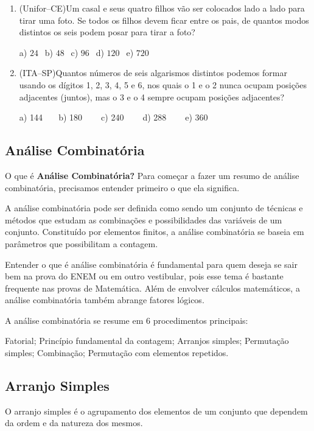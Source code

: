 \begin{multicols*}{2}
\begin{enumerate}
		\item  (Unifor–CE)Um casal e seus quatro filhos vão ser colocados lado a lado para tirar uma foto. Se todos os filhos devem ficar entre os pais, de quantos modos distintos os seis podem posar para tirar a foto?

		a) $24 \ \ $ b) $48 \ \ $ c) $96 \ \ $ d) $120 \ \ $ e) $720 \ \ $

		\item  (ITA–SP)Quantos números de seis algarismos distintos podemos formar usando os dígitos 1, 2, 3, 4, 5 e 6, nos quais o 1 e o 2 nunca ocupam posições adjacentes (juntos), mas o 3 e o 4 sempre ocupam posições adjacentes?

a) 144$ \ \ \ \ \ \ \ $ b) 180 $ \ \ \ \ \ \ \ $ c) 240 $ \ \ \ \ \ \ \ $ d) 288 $ \ \ \ \ \ \ \ $ e) 360
		
		\end{enumerate}

		\subsection{Análise Combinatória}


O que é \textbf{Análise Combinatória?}
Para começar a fazer um resumo de análise combinatória, precisamos entender primeiro o que ela significa.

A análise combinatória pode ser definida como sendo um conjunto de técnicas e métodos que estudam as combinações e possibilidades das variáveis de um conjunto. Constituído por elementos finitos, a análise combinatória se baseia em parâmetros que possibilitam a contagem.

Entender o que é análise combinatória é fundamental para quem deseja se sair bem na prova do ENEM ou em outro vestibular, pois esse tema é bastante frequente nas provas de Matemática. Além de envolver cálculos matemáticos, a análise combinatória também abrange fatores lógicos.

A análise combinatória se resume em 6 procedimentos principais:

Fatorial;
Princípio fundamental da contagem;
Arranjos simples;
Permutação simples;
Combinação;
Permutação com elementos repetidos.

\subsection{Arranjo Simples}
		
		O arranjo simples é o agrupamento dos elementos de um conjunto que dependem da ordem e da natureza dos mesmos.


\end{multicols*}
